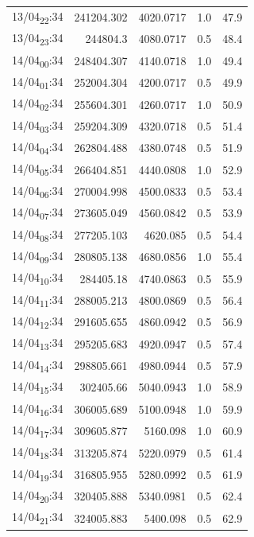 \documentclass[11pt]{article}
\begin{document}
\begin{center}
\begin{tabular}{lrrrr}
13/04\textsubscript{22}:34 & 241204.302 & 4020.0717 & 1.0 & 47.9\\[0pt]
13/04\textsubscript{23}:34 & 244804.3 & 4080.0717 & 0.5 & 48.4\\[0pt]
14/04\textsubscript{00}:34 & 248404.307 & 4140.0718 & 1.0 & 49.4\\[0pt]
14/04\textsubscript{01}:34 & 252004.304 & 4200.0717 & 0.5 & 49.9\\[0pt]
14/04\textsubscript{02}:34 & 255604.301 & 4260.0717 & 1.0 & 50.9\\[0pt]
14/04\textsubscript{03}:34 & 259204.309 & 4320.0718 & 0.5 & 51.4\\[0pt]
14/04\textsubscript{04}:34 & 262804.488 & 4380.0748 & 0.5 & 51.9\\[0pt]
14/04\textsubscript{05}:34 & 266404.851 & 4440.0808 & 1.0 & 52.9\\[0pt]
14/04\textsubscript{06}:34 & 270004.998 & 4500.0833 & 0.5 & 53.4\\[0pt]
14/04\textsubscript{07}:34 & 273605.049 & 4560.0842 & 0.5 & 53.9\\[0pt]
14/04\textsubscript{08}:34 & 277205.103 & 4620.085 & 0.5 & 54.4\\[0pt]
14/04\textsubscript{09}:34 & 280805.138 & 4680.0856 & 1.0 & 55.4\\[0pt]
14/04\textsubscript{10}:34 & 284405.18 & 4740.0863 & 0.5 & 55.9\\[0pt]
14/04\textsubscript{11}:34 & 288005.213 & 4800.0869 & 0.5 & 56.4\\[0pt]
14/04\textsubscript{12}:34 & 291605.655 & 4860.0942 & 0.5 & 56.9\\[0pt]
14/04\textsubscript{13}:34 & 295205.683 & 4920.0947 & 0.5 & 57.4\\[0pt]
14/04\textsubscript{14}:34 & 298805.661 & 4980.0944 & 0.5 & 57.9\\[0pt]
14/04\textsubscript{15}:34 & 302405.66 & 5040.0943 & 1.0 & 58.9\\[0pt]
14/04\textsubscript{16}:34 & 306005.689 & 5100.0948 & 1.0 & 59.9\\[0pt]
14/04\textsubscript{17}:34 & 309605.877 & 5160.098 & 1.0 & 60.9\\[0pt]
14/04\textsubscript{18}:34 & 313205.874 & 5220.0979 & 0.5 & 61.4\\[0pt]
14/04\textsubscript{19}:34 & 316805.955 & 5280.0992 & 0.5 & 61.9\\[0pt]
14/04\textsubscript{20}:34 & 320405.888 & 5340.0981 & 0.5 & 62.4\\[0pt]
14/04\textsubscript{21}:34 & 324005.883 & 5400.098 & 0.5 & 62.9\\[0pt]

\end{tabular}
\end{center}
\end{document}
